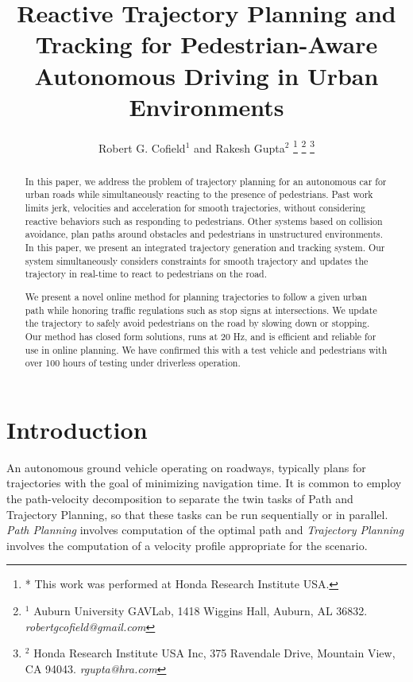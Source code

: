 \documentclass[letterpaper, 10 pt, conference]{ieeeconf}  %
\title{\LARGE \bf
  Reactive Trajectory Planning and Tracking for Pedestrian-Aware Autonomous Driving in Urban Environments
}
\author{
  Robert G. Cofield$^{1}$ and
  Rakesh Gupta$^{2}$
  \thanks{
    * This work was performed at Honda Research Institute USA.
  }
  \thanks{
    $^{1}$ Auburn University GAVLab, 1418 Wiggins Hall, Auburn, AL 36832. \textit{robertgcofield@gmail.com}
  }
  \thanks{
    $^{2}$ Honda Research Institute USA Inc, 375 Ravendale Drive, Mountain View, CA 94043. \textit{rgupta@hra.com}
  }
}
\begin{document}
\maketitle
\thispagestyle{empty}
\pagestyle{empty}

\begin{abstract}
In this paper, we address the problem of trajectory planning for an autonomous car for urban roads while simultaneously reacting to the presence of pedestrians.
Past work limits jerk, velocities and acceleration for smooth trajectories, without considering reactive behaviors such as responding to pedestrians.
Other systems based on collision avoidance, plan paths around obstacles and pedestrians in unstructured environments.
In this paper, we present an integrated trajectory generation and tracking system. %
Our system simultaneously considers constraints for smooth trajectory and updates the trajectory in real-time to react to pedestrians on the road. 

We present a novel online method for planning %
trajectories to follow a given urban path while honoring traffic regulations such as stop signs at intersections. 
We update the trajectory to safely avoid pedestrians on the road by slowing down or stopping.
Our method has closed form solutions, runs at 20 Hz, and is efficient and reliable for use in online planning.
We have confirmed this with a test vehicle and pedestrians with over 100 hours of testing under driverless operation.

\end{abstract}

\section{Introduction} \label{sec:introduction}

An autonomous ground vehicle operating on roadways, typically plans for trajectories with the goal of minimizing navigation time.
It is common to employ the path-velocity decomposition to separate the twin tasks of Path and Trajectory Planning, so that these tasks can be run sequentially or in parallel.
{\it Path Planning} involves computation of the optimal path and {\it Trajectory Planning} involves the computation of a velocity profile appropriate for the scenario.
\end{document}
